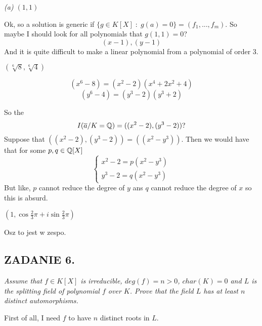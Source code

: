 \documentclass{article}
\begin{document}
\emph{\color{pink}(a) $(1, 1)$}
\smallskip

Ok, so a solution is generic if $\{g\in K[X]\;:\;g(a)=0\}=(f_1,...,f_m)$. So maybe I should look for all polynomials that $g(1, 1)=0$?
$$(x-1),(y-1)$$
And it is quite difficult to make a linear polynomial from a polynomial of order $3$.

\emph{\color{pink} $(\sqrt[6]{8}, \sqrt[6]{4})$}
\smallskip

$$(x^6-8)=(x^2-2)(x^4+2x^2+4)$$
$$(y^6-4)=(y^3-2)(y^3+2)$$

So the 
$$I(\overline a/K=\mathbb{Q})=((x^2-2), (y^3-2))?$$ 
Suppose that $((x^2-2), (y^3-2))=((x^2-y^3))$. Then we would have that for some $p, q\in \mathbb{Q}[X]$
$$\begin{cases}
    x^2-2=p(x^2-y^3)\\
    y^3-2=q(x^2-y^3)
\end{cases}$$
But like, $p$ cannot reduce the degree of $y$ ans $q$ cannot reduce the degree of $x$ so this is absurd.

\emph{\color{pink} $(1, \cos\frac23\pi+i\sin\frac23\pi)$}

Osz to jest w zespo.

\subsection*{ZADANIE 6.}
\emph{\color{pink}Assume that $f\in K[X]$ is irreducible, $deg(f)=n>0$, $char(K)=0$ and $L$ is the splitting field of polynomial $f$ over $K$. Prove that the field $L$ has at least $n$ distinct automorphisms.}
\smallskip

First of all, I need $f$ to have $n$ distinct roots in $L$. 



\end{document}
